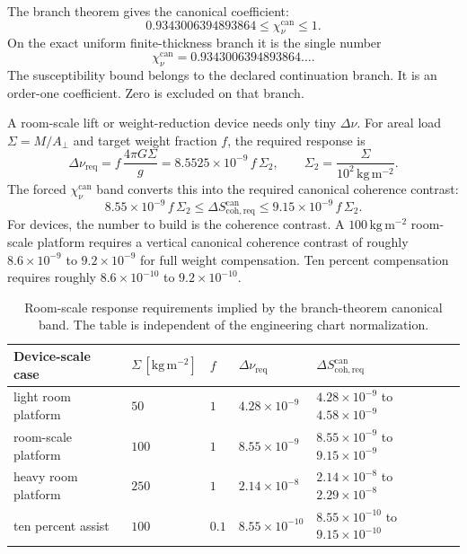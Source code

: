 \documentclass[11pt]{article}
\numberwithin{equation}{section}
\theoremstyle{remark}
\newcommand{\chican}{\chi_\nu^{\mathrm{can}}}
\begin{document}
The branch theorem gives the canonical coefficient:
\[
0.9343006394893864
\le
\chican
\le
1.
\]
On the exact uniform finite-thickness branch it is the single number
\[
\chican=0.9343006394893864\ldots .
\]
The susceptibility bound belongs to the declared continuation branch. It is an
order-one coefficient. Zero is excluded on that branch.

A room-scale lift or weight-reduction device needs only tiny \(\Delta\nu\). For
areal load \(\Sigma=M/A_\perp\) and target weight fraction \(f\), the required
response is
\[
\Delta\nu_{\mathrm{req}}
=
f\,\frac{4\pi G\Sigma}{g}
=
8.5525\times10^{-9}\,f\,\Sigma_2,
\qquad
\Sigma_2=\frac{\Sigma}{10^2\,\mathrm{kg\,m^{-2}}}.
\]
The forced \(\chican\) band converts this into the required canonical coherence
contrast:
\[
\boxed{
8.55\times10^{-9}\,f\,\Sigma_2
\le
\Delta S_{\mathrm{coh,req}}^{\mathrm{can}}
\le
9.15\times10^{-9}\,f\,\Sigma_2.
}
\]
For devices, the number to build is the coherence contrast. A
\(100\,\mathrm{kg\,m^{-2}}\) room-scale platform requires a vertical canonical
coherence contrast of roughly \(8.6\times10^{-9}\) to \(9.2\times10^{-9}\) for
full weight compensation. Ten percent compensation requires roughly
\(8.6\times10^{-10}\) to \(9.2\times10^{-10}\).

\begin{table}[h]
\centering
\small
\begin{tabularx}{\textwidth}{@{}L{0.23\textwidth}R{0.15\textwidth}R{0.08\textwidth}R{0.18\textwidth}X@{}}
\toprule
Device-scale case &
\(\Sigma\,[\mathrm{kg\,m^{-2}}]\) &
\(f\) &
\(\Delta\nu_{\mathrm{req}}\) &
\(\Delta S_{\mathrm{coh,req}}^{\mathrm{can}}\) \\
\midrule
light room platform & \(50\) & \(1\) & \(4.28\times10^{-9}\) & \(4.28\times10^{-9}\) to \(4.58\times10^{-9}\) \\
room-scale platform & \(100\) & \(1\) & \(8.55\times10^{-9}\) & \(8.55\times10^{-9}\) to \(9.15\times10^{-9}\) \\
heavy room platform & \(250\) & \(1\) & \(2.14\times10^{-8}\) & \(2.14\times10^{-8}\) to \(2.29\times10^{-8}\) \\
ten percent assist & \(100\) & \(0.1\) & \(8.55\times10^{-10}\) & \(8.55\times10^{-10}\) to \(9.15\times10^{-10}\) \\
\bottomrule
\end{tabularx}
\caption{Room-scale response requirements implied by the branch-theorem canonical band. The table is independent of the engineering chart normalization.}
\label{tab:room-scale-canonical}
\end{table}
\end{document}
